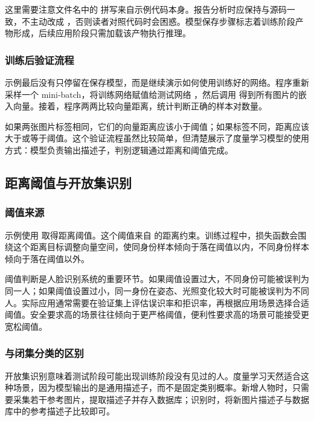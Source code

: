 这里需要注意文件名中的  拼写来自示例代码本身。报告分析时应保持与源码一致，不主动改成 ，否则读者对照代码时会困惑。模型保存步骤标志着训练阶段产物形成，后续应用阶段只需加载该产物执行推理。

\subsubsection{训练后验证流程}

示例最后没有只停留在保存模型，而是继续演示如何使用训练好的网络。程序重新采样一个 mini-batch，将训练网络赋值给测试网络 ，然后调用  得到所有图片的嵌入向量。接着，程序两两比较向量距离，统计判断正确的样本对数量。

如果两张图片标签相同，它们的向量距离应该小于阈值；如果标签不同，距离应该大于或等于阈值。这个验证流程虽然比较简单，但清楚展示了度量学习模型的使用方式：模型负责输出描述子，判别逻辑通过距离和阈值完成。

\subsection{距离阈值与开放集识别}

\subsubsection{阈值来源}

示例使用  取得距离阈值。这个阈值来自  的距离约束。训练过程中，损失函数会围绕这个距离目标调整向量空间，使同身份样本倾向于落在阈值以内，不同身份样本倾向于落在阈值以外。

阈值判断是人脸识别系统的重要环节。如果阈值设置过大，不同身份可能被误判为同一人；如果阈值设置过小，同一身份在姿态、光照变化较大时可能被误判为不同人。实际应用通常需要在验证集上评估误识率和拒识率，再根据应用场景选择合适阈值。安全要求高的场景往往倾向于更严格阈值，便利性要求高的场景可能接受更宽松阈值。

\subsubsection{与闭集分类的区别}

开放集识别意味着测试阶段可能出现训练阶段没有见过的人。度量学习天然适合这种场景，因为模型输出的是通用描述子，而不是固定类别概率。新增人物时，只需要采集若干参考图片，提取描述子并存入数据库；识别时，将新图片描述子与数据库中的参考描述子比较即可。

